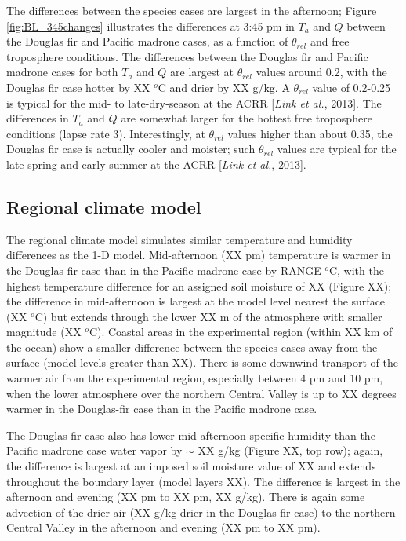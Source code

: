 The differences between the species cases are largest in the afternoon; Figure \ref{fig:BL_345changes} illustrates the differences at 3:45 pm in $T_a$ and $Q$ between the Douglas fir and Pacific madrone cases, as a function of $\theta_{rel}$ and free troposphere conditions.  The differences between the Douglas fir and Pacific madrone cases for both $T_a$ and $Q$ are largest at $\theta_{rel}$ values around 0.2, with the Douglas fir case hotter by XX $^o$C and drier by XX g/kg.  A $\theta_{rel}$ value of 0.2-0.25 is typical for the mid- to late-dry-season at the ACRR [\textit{Link et al.}, 2013].  The differences in $T_a$ and $Q$ are somewhat larger for the hottest free troposphere conditions (lapse rate 3).  Interestingly, at $\theta_{rel}$ values higher than about 0.35, the Douglas fir case is actually cooler and moister; such $\theta_{rel}$ values are typical for the late spring and early summer at the ACRR [\textit{Link et al.}, 2013].


\subsection{Regional climate model}
The regional climate model simulates similar temperature and humidity differences as the 1-D model.  Mid-afternoon (XX pm) temperature is warmer in the Douglas-fir case than in the Pacific madrone case by RANGE $^o$C, with the highest temperature difference for an assigned soil moisture of XX (Figure XX); the difference in mid-afternoon is largest at the model level nearest the surface (XX $^o$C) but extends through the lower XX m of the atmosphere with smaller magnitude (XX $^o$C).  Coastal areas in the experimental region (within XX km of the ocean) show a smaller difference between the species cases away from the surface (model levels greater than XX).  There is some downwind transport of the warmer air from the experimental region, especially between 4 pm and 10 pm, when the lower atmosphere over the northern Central Valley is up to XX degrees warmer in the Douglas-fir case than in the Pacific madrone case.

The Douglas-fir case also has lower mid-afternoon specific humidity than the Pacific madrone case water vapor by $\sim$ XX g/kg (Figure XX, top row); again, the difference is largest at an imposed soil moisture value of XX and extends throughout the boundary layer (model layers XX).  The difference is largest in the afternoon and evening (XX pm to XX pm, XX g/kg).  There is again some advection of the drier air (XX g/kg drier in the Douglas-fir case) to the northern Central Valley in the afternoon and evening (XX pm to XX pm).

